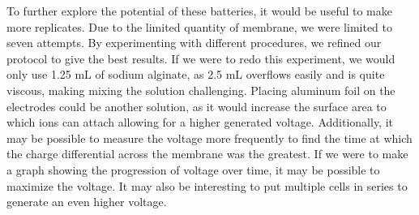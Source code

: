 \documentclass[letterpaper]{article}
\begin{document}
To further explore the potential of these batteries, it would be useful to make more replicates. Due to the limited quantity of membrane, we were limited to seven attempts. By experimenting with different procedures, we refined our protocol to give the best results. If we were to redo this experiment, we would only use 1.25 mL of sodium alginate, as 2.5 mL overflows easily and is quite viscous, making mixing the solution challenging. Placing aluminum foil on the electrodes could be another solution, as it would increase the surface area to which ions can attach allowing for a higher generated voltage. Additionally, it may be possible to measure the voltage more frequently to find the time at which the charge differential across the membrane was the greatest. If we were to make a graph showing the progression of voltage over time, it may be possible to maximize the voltage. It may also be interesting to put multiple cells in series to generate an even higher voltage.


\printbibliography[heading=bibintoc]
\end{document}
